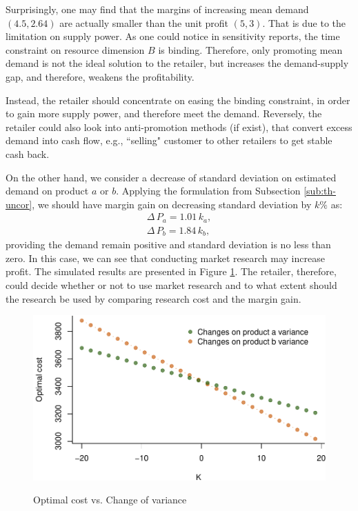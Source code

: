 \documentclass[a4paper,11pt]{article}
\begin{document}
Surprisingly, one may find that the margins of increasing mean demand $(4.5,2.64)$ are actually smaller than the unit profit $(5,3)$. That is due to the limitation on supply power. As one could notice in sensitivity reports, the time constraint on resource dimension $B$ is binding. Therefore, only promoting mean demand is not the ideal solution to the retailer, but increases the demand-supply gap, and therefore, weakens the profitability.

Instead, the retailer should concentrate on easing the binding constraint, in order to gain more supply power, and therefore meet the demand. Reversely, the retailer could also look into anti-promotion methods (if exist), that convert excess demand into cash flow, e.g., ``selling" customer to other retailers to get stable cash back.

On the other hand, we consider a decrease of standard deviation on estimated demand on product $a$ or $b$. Applying the formulation from Subsection \ref{sub:th-uncor}, we should have margin gain on decreasing standard deviation by $k\%$ as:
\[
\begin{aligned}
    \Delta \, P_a = 1.01 \, k_a,\\
    \Delta \, P_b = 1.84 \, k_b,
\end{aligned}
\]
providing the demand remain positive and standard deviation is no less than zero. In this case, we can see that conducting market research may increase profit. The simulated results are presented in Figure \ref{fig:var}. The retailer, therefore, could decide whether or not to use market research and to what extent should the research be used by comparing research cost and the margin gain.
\begin{figure}[htb]
\centering
\caption{Optimal cost vs. Change of variance}
\includegraphics{Example-figure_files/figure-latex/var-1.pdf}
\label{fig:var}
\end{figure}
\end{document}
